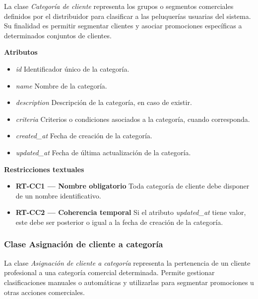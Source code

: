 La clase \textit{Categoría de cliente} representa los grupos o segmentos comerciales definidos por el distribuidor para clasificar a las peluquerías usuarias del sistema. Su finalidad es permitir segmentar clientes y asociar promociones específicas a determinados conjuntos de clientes.

\textbf{Atributos}

\begin{itemize}

      \item \textit{id}
            Identificador único de la categoría.
      \item \textit{name}
            Nombre de la categoría.
      \item \textit{description}
            Descripción de la categoría, en caso de existir.
      \item \textit{criteria}
            Criterios o condiciones asociados a la categoría, cuando corresponda.
      \item \textit{created\_at}
            Fecha de creación de la categoría.
      \item \textit{updated\_at}
            Fecha de última actualización de la categoría.

\end{itemize}

\textbf{Restricciones textuales}

\begin{itemize}

      \item \textbf{RT-CC1 — Nombre obligatorio}
            Toda categoría de cliente debe disponer de un nombre identificativo.
      \item \textbf{RT-CC2 — Coherencia temporal}
            Si el atributo \textit{updated\_at} tiene valor, este debe ser posterior o igual a la fecha de creación de la categoría.

\end{itemize}

\subsubsection{Clase Asignación de cliente a categoría}

La clase \textit{Asignación de cliente a categoría} representa la pertenencia de un cliente profesional a una categoría comercial determinada. Permite gestionar clasificaciones manuales o automáticas y utilizarlas para segmentar promociones u otras acciones comerciales.

